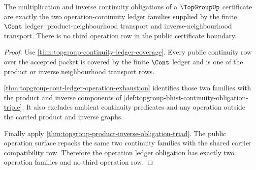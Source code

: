 \begin{theorem}
\label{thm:topgroup-operation-ledger-obligation}
The multiplication and inverse continuity obligations of a $\TopGroupUp$
certificate are exactly the two operation-continuity ledger families supplied
by the finite $\Cont$ ledger: product-neighbourhood transport and
inverse-neighbourhood transport. There is no third operation row in the public
certificate boundary.
\end{theorem}
\begin{proof}
Use \autoref{thm:topgroup-continuity-ledger-coverage}. Every public continuity
row over the accepted packet is covered by the finite $\Cont$ ledger and is one
of the product or inverse neighbourhood transport rows.

\autoref{thm:topgroup-cont-ledger-operation-exhaustion} identifies those two
families with the product and inverse components of
\autoref{def:topgroup-bhist-continuity-obligation-triple}. It also excludes
ambient continuity predicates and any operation outside the carried product and
inverse graphs.

Finally apply \autoref{thm:topgroup-product-inverse-obligation-triad}. The
public operation surface repacks the same two continuity families with the
shared carrier compatibility row. Therefore the operation ledger obligation has
exactly two operation families and no third operation row.
\end{proof}

